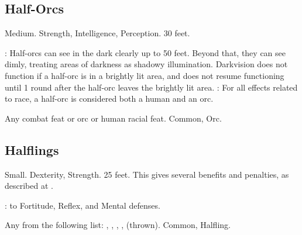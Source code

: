 \subsection{Half-Orcs}
 Medium.
  Strength,  Intelligence,  Perception.
 30 feet.
\begin{itemize}
    : Half-orcs can see in the dark clearly up to 50 feet.   Beyond that, they can see dimly, treating areas of darkness as shadowy illumination. Darkvision does not function if a half-orc is in a brightly lit area, and does not resume functioning until 1 round after the half-orc leaves the brightly lit area.
    : For all effects related to race, a half-orc is considered both a human and an orc.
\end{itemize}
 Any combat feat or orc or human racial feat.
 Common, Orc.

\subsection{Halflings}
 Small.
  Dexterity,  Strength.
 25 feet. This gives several benefits and penalties, as described at .
\begin{itemize}
    :  to Fortitude, Reflex, and Mental defenses.
\end{itemize}
 Any from the following list: , , , ,  (thrown).
 Common, Halfling.
